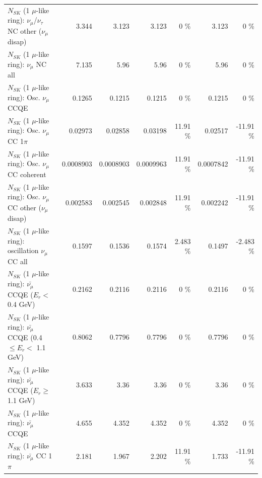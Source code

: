 \begin{table}
\begin{tabular}{| l | r | r | r  r | r  r |}
   $N_{SK}$ (1 $\mu$-like ring): $\nu_\mu$/$\nu_\tau$ NC other ($\nu_\mu$ disap) &           3.344 &           3.123 &           3.123 &        0 \%  &           3.123 &        0 \%  \\ 
                                $N_{SK}$ (1 $\mu$-like ring): $\nu_{\mu}$ NC all &           7.135 &            5.96 &            5.96 &        0 \%  &            5.96 &        0 \%  \\ 
\hline
\hline
                               $N_{SK}$ (1 $\mu$-like ring): Osc. $\nu_\mu$ CCQE &          0.1265 &          0.1215 &          0.1215 &        0 \%  &          0.1215 &        0 \%  \\ 
                          $N_{SK}$ (1 $\mu$-like ring): Osc. $\nu_\mu$ CC 1$\pi$ &         0.02973 &         0.02858 &         0.03198 &    11.91 \%  &         0.02517 &   -11.91 \%  \\ 
                        $N_{SK}$ (1 $\mu$-like ring): Osc. $\nu_\mu$ CC coherent &       0.0008903 &       0.0008903 &       0.0009963 &    11.91 \%  &       0.0007842 &   -11.91 \%  \\ 
         $N_{SK}$ (1 $\mu$-like ring): Osc. $\nu_\mu$ CC other ($\nu_\mu$ disap) &        0.002583 &        0.002545 &        0.002848 &    11.91 \%  &        0.002242 &   -11.91 \%  \\ 
                      $N_{SK}$ (1 $\mu$-like ring): oscillation $\nu_\mu$ CC all &          0.1597 &          0.1536 &          0.1574 &    2.483 \%  &          0.1497 &   -2.483 \%  \\ 
\hline
\hline
          $N_{SK}$ (1 $\mu$-like ring): $\bar{\nu_\mu}$ CCQE ($E_{r} <$ 0.4 GeV) &          0.2162 &          0.2116 &          0.2116 &        0 \%  &          0.2116 &        0 \%  \\ 
 $N_{SK}$ (1 $\mu$-like ring): $\bar{\nu_\mu}$ CCQE (0.4 $\leq E_{r} <$ 1.1 GeV) &          0.8062 &          0.7796 &          0.7796 &        0 \%  &          0.7796 &        0 \%  \\ 
       $N_{SK}$ (1 $\mu$-like ring): $\bar{\nu_\mu}$ CCQE ($E_{r} \geq$ 1.1 GeV) &           3.633 &            3.36 &            3.36 &        0 \%  &            3.36 &        0 \%  \\ 
\hline
                              $N_{SK}$ (1 $\mu$-like ring): $\bar{\nu_\mu}$ CCQE &           4.655 &           4.352 &           4.352 &        0 \%  &           4.352 &        0 \%  \\ 
                         $N_{SK}$ (1 $\mu$-like ring): $\bar{\nu_\mu}$ CC 1$\pi$ &           2.181 &           1.967 &           2.202 &    11.91 \%  &           1.733 &   -11.91 \%  \\ 

\end{tabular}
\end{table}
